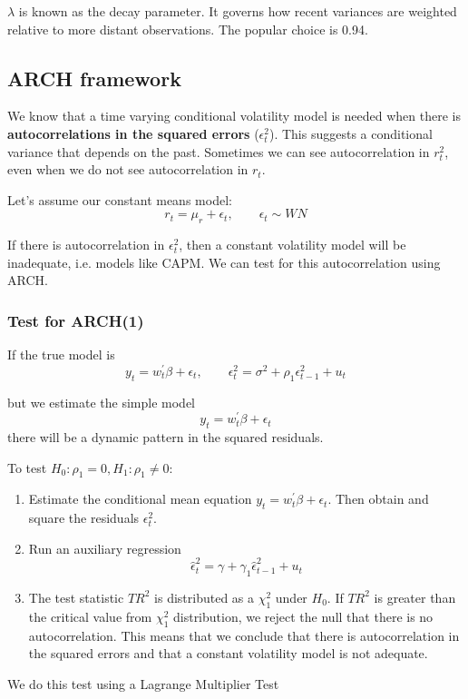\documentclass[11pt]{article}
\begin{document}
$\lambda$ is known as the decay parameter. It governs how recent variances are weighted relative to more distant observations. The popular choice is 0.94.

\subsection{ARCH framework}

We know that a time varying conditional volatility model is needed when there is \textbf{autocorrelations in the squared errors} ($\epsilon_t^2$). This suggests a conditional variance that depends on the past. Sometimes we can see autocorrelation in $r_t^2$, even when we do not see autocorrelation in $r_t$.

Let's assume our constant means model:
\[r_t = \mu_r + \epsilon_t, \qquad \epsilon_t \sim WN\]

If there is autocorrelation in $\epsilon_t^2$, then a constant volatility model will be inadequate, i.e. models like CAPM. We can test for this autocorrelation using ARCH.

\subsubsection{Test for ARCH(1)}
If the true model is
\[y_t = w_t^\prime \beta + \epsilon_t, \qquad \epsilon_t^2 = \sigma^2 + \rho_1 \epsilon_{t-1}^2 + u_t\]

but we estimate the simple model
\[y_t = w_t^\prime \beta + \epsilon_t\]
there will be a dynamic pattern in the squared residuals.

\begin{procedure}

To test $H_0:\rho_1=0, H_1: \rho_1 \neq 0$:
\begin{enumerate}
\item Estimate the conditional mean equation $y_t = w_t^\prime \beta + \epsilon_t$. Then obtain and square the residuals $\epsilon_t^2$.

\item Run an auxiliary regression
\[\hat{\epsilon}_t^2 = \gamma + \gamma_1\hat{\epsilon}_{t-1}^2 + u_t\]

\item The test statistic $TR^2$ is distributed as a $\chi_1^2$ under $H_0$. If $TR^2$ is greater than the critical value from $\chi_1^2$ distribution, we reject the null that there is no autocorrelation. This means that we conclude that there is autocorrelation in the squared errors and that a constant volatility model is not adequate.
\end{enumerate}

We do this test using a Lagrange Multiplier Test

\end{procedure}
\end{document}
